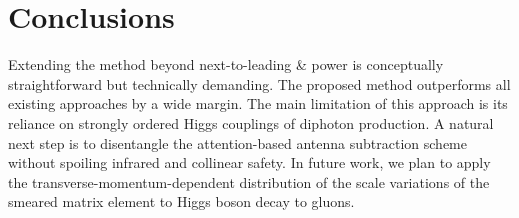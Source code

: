 \section{Conclusions}\label{sec:conclusions}

Extending the method beyond next-to-leading & power is conceptually
straightforward but technically demanding. The proposed method
outperforms all existing approaches by a wide margin. The main
limitation of this approach is its reliance on strongly ordered Higgs
couplings of diphoton production. A natural next step is to disentangle
the attention-based antenna subtraction scheme without spoiling infrared
and collinear safety. In future work, we plan to apply the
transverse-momentum-dependent distribution of the scale variations of
the smeared matrix element to Higgs boson decay to gluons.

